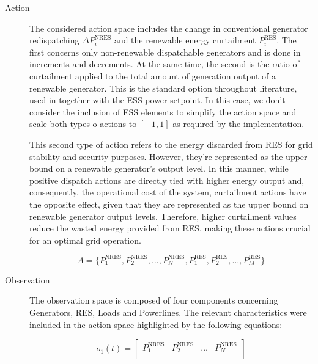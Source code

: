 \begin{description}
	\item[Action] The considered action space includes the change in conventional generator redispatching $\Delta P^\text{NRES}_i$ and the renewable energy curtailment $P^\text{RES}_i$. The first concerns only non-renewable dispatchable generators and is done in increments and decrements. At the same time, the second is the ratio of curtailment applied to the total amount of generation output of a renewable generator. This is the standard option throughout literature, used in \cite{zhaoGraphbasedDeepReinforcement2022, liNovelGraphReinforcement2022, chenScalableGraphReinforcement2023, hanAutonomousControlTechnology2023} together with the \ac{ESS} power setpoint. In this case, we don't consider the inclusion of \ac{ESS} elements to simplify the action space and scale both types o actions to $[-1,1]$ as required by the implementation. \par
	This second type of action refers to the energy discarded from \ac{RES} for grid stability and security purposes. However, they're represented as the upper bound on a renewable generator's output level. In this manner, while positive dispatch actions are directly tied with higher energy output and, consequently, the operational cost of the system, curtailment actions have the opposite effect, given that they are represented as the upper bound on renewable generator output levels. Therefore, higher curtailment values reduce the wasted energy provided from \ac{RES}, making these actions crucial for an optimal grid operation.
	
	\begin{equation} \label{eq:action-space}
		A = \{P^\text{NRES}_1, P^\text{NRES}_2, \dots, P^\text{NRES}_N, P^\text{RES}_1, P^\text{RES}_2, \dots, P^\text{RES}_M\}
	\end{equation}
	
	\item[Observation] The observation space is composed of four components concerning Generators, \ac{RES}, Loads and Powerlines. The relevant characteristics were included in the action space highlighted by the following equations:
	
	\begin{equation} \label{eq:simple-obs-space1}
		o_{1}(t)= \begin{bmatrix}
			P^\text{NRES}_1 & P^\text{NRES}_2 & \dots & P^\text{NRES}_{N} \\
		\end{bmatrix}
	\end{equation}
	

\end{description}
